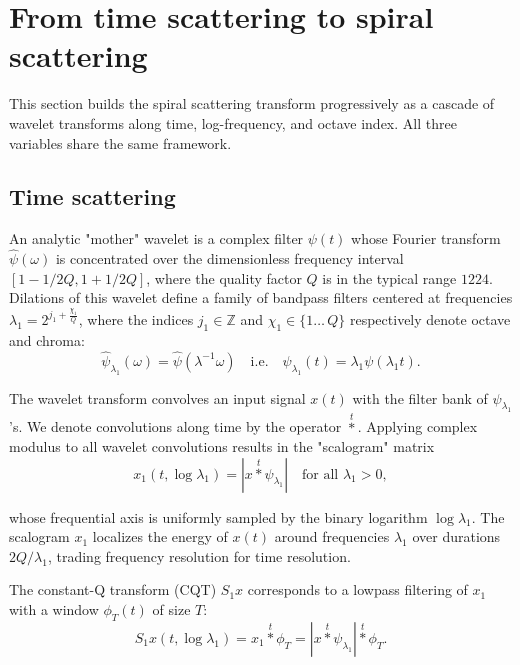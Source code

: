 \documentclass[twoside,a4paper]{article}
\begin{document}
\section{From time scattering to spiral scattering}
This section builds the spiral scattering transform progressively as a cascade of wavelet transforms along time, log-frequency, and octave index. All three variables share the same framework.

\subsection{Time scattering}

An analytic "mother" wavelet is a complex filter $\psi(t)$
whose Fou\-rier transform $\widehat{\psi}(\omega)$ is concentrated over the
dimensionless frequency interval $[1-1/2Q,1+1/2Q]$, where the quality factor $Q$ is in the typical range $12$\textendash$24$. Dilations of this wavelet
define a family of bandpass filters centered at frequencies
$ \lambda_{1} = 2^{j_{1} + \frac{\chi_{1}}{Q}}$,
where the indices $j_{1} \in \mathbb{Z}$ and $\chi_{1} \in \{1\ldots\,Q\}$ respectively denote octave and chroma:
\begin{equation}
    \widehat{\psi}_{\lambda_{1}}(\omega) = \widehat{\psi}(\lambda^{-1}\omega)
    \quad\mathrm{i.e.}\quad
    \psi_{\lambda_{1}}(t)=\lambda_{1}\psi(\lambda_{1}t).
\label{eq:wavelet-dilations}
\end{equation}

The wavelet transform convolves an input signal $x(t)$ with the filter bank of $\psi_{\lambda_1}$'s. We denote convolutions along time by the operator $\overset{t}{\ast}$. Applying complex modulus to all wavelet convolutions results in the "scalogram" matrix
\begin{equation}
    x_1(t, \log \lambda_1) =
    |x \overset{t}{\ast} \psi_{\lambda_1}| \quad \text{for all } \lambda_1 > 0,
\label{eq:scalogram}
\end{equation}

whose frequential axis is uniformly sampled by the binary logarithm $\log \lambda_1$. The scalogram $x_1$ localizes the energy of $x(t)$ around frequencies $\lambda_1$ over durations $2 Q / \lambda_1$, trading frequency resolution for time resolution.

The constant-Q transform (CQT) $S_1 x$ corresponds to a lowpass filtering of $x_1$ with a window $\phi_T(t)$ of size $T$:
\begin{equation}
S_1 x (t, \log \lambda_1) =
x_1 \overset{t}{\ast} \phi_T =
| x \overset{t}{\ast} \psi_{\lambda_{1}} | \overset{t}{\ast} \phi_T.
\label{eq:S1}
\end{equation}
\end{document}
